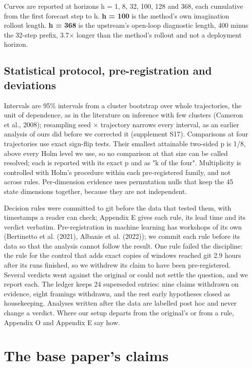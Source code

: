 \documentclass[10pt]{article}
\begin{document}
Curves are reported at horizons h = 1, 8, 32, 100, 128 and 368, each cumulative from the first forecast step to h. \textbf{h = 100} is the method's own imagination rollout length. \textbf{h = 368} is the upstream's open-loop diagnostic length, 400 minus the 32-step prefix, 3.7$\times$ longer than the method's rollout and not a deployment horizon.

\subsection{Statistical protocol, pre-registration and deviations}

Intervals are 95\% intervals from a cluster bootstrap over whole trajectories, the unit of dependence, as in the literature on inference with few clusters (Cameron et al., 2008); resampling seed $\times$ trajectory narrows every interval, as an earlier analysis of ours did before we corrected it (supplement S17). Comparisons at four trajectories use exact sign-flip tests. Their smallest attainable two-sided p is 1/8, above every Holm level we use, so no comparison at that size can be called resolved; each is reported with its exact p and as "k of the four". Multiplicity is controlled with Holm's procedure within each pre-registered family, and not across rules. Per-dimension evidence uses permutation nulls that keep the 45 state dimensions together, because they are not independent.

Decision rules were committed to git before the data that tested them, with timestamps a reader can check; Appendix E gives each rule, its lead time and its verdict verbatim. Pre-registration in machine learning has workshops of its own (Bertinetto et al. (2021), Albanie et al. (2022)); we commit each rule before its data so that the analysis cannot follow the result. One rule failed the discipline: the rule for the control that adds exact copies of windows reached git 2.9 hours after its runs finished, so we withdrew its claim to have been pre-registered. Several verdicts went against the original or could not settle the question, and we report each. The ledger keeps 24 superseded entries: nine claims withdrawn on evidence, eight framings withdrawn, and the rest early hypotheses closed as housekeeping. Analyses written after the data are labelled post hoc and never change a verdict. Where our setup departs from the original's or from a rule, Appendix O and Appendix E say how.


\section{The base paper's claims}
\end{document}
